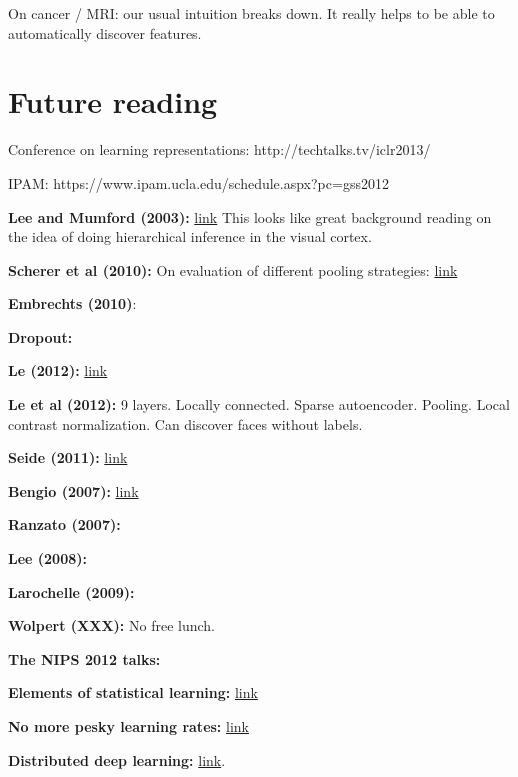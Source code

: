 \documentclass[12pt]{report}
\newcommand{\link}[2]{\href{#1}{#2}}
\begin{document}
On cancer / MRI: our usual intuition breaks down.  It really helps to
be able to automatically discover features.


\section{Future reading}

Conference on learning representations: http://techtalks.tv/iclr2013/

IPAM: https://www.ipam.ucla.edu/schedule.aspx?pc=gss2012

\textbf{Lee and Mumford (2003):}
\link{http://dash.harvard.edu/bitstream/handle/1/3637109/Mumford\_HierarchBayesInfer.pdf?sequence=1}{link}
This looks like great background reading on the idea of doing
hierarchical inference in the visual cortex.

\textbf{Scherer et al (2010):} On evaluation of different pooling strategies: \link{http://www.ais.uni-bonn.de/papers/icann2010\_maxpool.pdf}{link}



\textbf{Embrechts (2010)}:

\textbf{Dropout:}

\textbf{Le (2012):} \link{https://plus.google.com/u/0/+ResearchatGoogle/posts/EMyhnBetd2F}{link}

\textbf{Le et al (2012):} 9 layers.  Locally connected.  Sparse
autoencoder.  Pooling.  Local contrast normalization.  Can discover
faces without labels.

\textbf{Seide (2011):}
\link{http://research.microsoft.com/apps/pubs/default.aspx?id=153169}{link}

\textbf{Bengio (2007):} \link{http://arxiv.org/pdf/1206.5533v2.pdf}{link}

\textbf{Ranzato (2007):}

\textbf{Lee (2008):} 

\textbf{Larochelle (2009):}

\textbf{Wolpert (XXX):} No free lunch.

\textbf{The NIPS 2012 talks:}

\textbf{Elements of statistical learning:} \link{http://www.stanford.edu/\~hastie/local.ftp/Springer/OLD//ESLII\_print4.pdf}{link}

\textbf{No more pesky learning rates:} \link{http://arxiv.org/pdf/1206.1106.pdf}{link}

\textbf{Distributed deep learning:}
\link{http://research.google.com/archive/large\_deep\_networks_nips2012.html}{link}.
\end{document}

